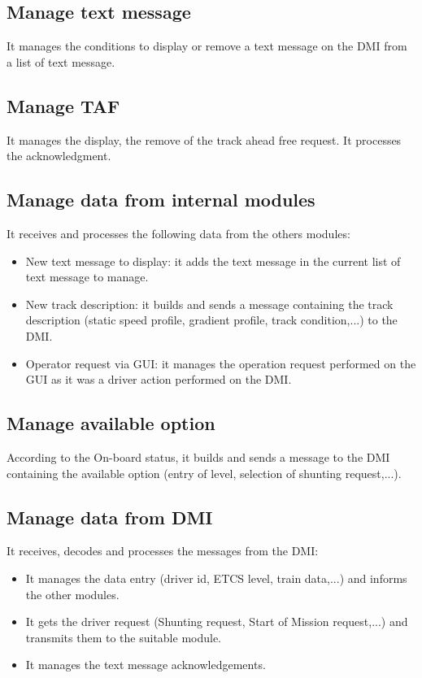 \documentclass[nocc]{template/openetcs_report}
\begin{document}
\subsection{Manage text message}
It manages the conditions to display or remove a text message on the DMI from a list of text message.
\subsection{Manage TAF}
It manages the display, the remove of the track ahead free request. It processes the acknowledgment.

\subsection{Manage data from internal modules}
It receives and processes the following data from the others modules:
\begin{itemize}
\item New text message to display: it adds the text message in the current list of text message to manage.
\item New track description: it builds and sends a message containing the track description (static speed profile, gradient profile, track condition,...) to the DMI.
\item Operator request via GUI: it manages the operation request performed on the GUI as it was a driver action performed on the DMI.
\end{itemize}

\subsection{Manage available option}
According to the On-board status, it builds and sends a message to the DMI containing the available option (entry of level, selection of shunting request,...).

\subsection{Manage data from DMI}
It receives, decodes and processes the messages from the DMI:
\begin{itemize}
\item It manages the data entry (driver id, ETCS level, train data,...) and informs the other modules.
\item It gets the driver request (Shunting request, Start of Mission request,...) and transmits them to the suitable module.
\item It manages the text message acknowledgements.
\end{itemize}
\end{document}
